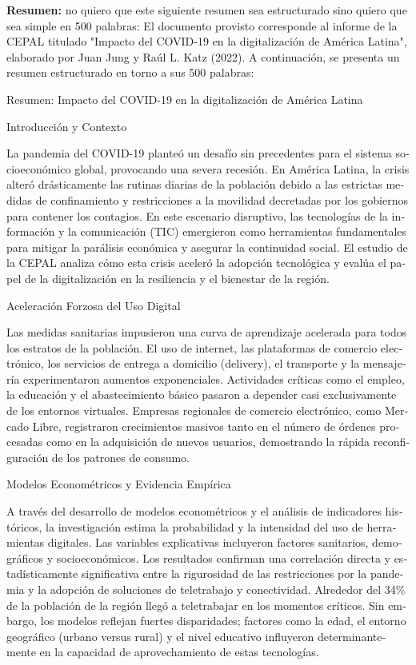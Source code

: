 \begin{tcolorbox}[colback=brown!8!white,colframe=brown!8!white,boxrule=0pt,arc=2pt,left=4pt,right=4pt,top=3pt,bottom=3pt,before skip=4pt,after skip=4pt]
\begin{otherlanguage}{spanish}
\sffamily\small \textbf{Resumen:} no quiero que este siguiente resumen sea estructurado sino quiero que sea simple en 500 palabras: El documento provisto corresponde al informe de la CEPAL titulado "Impacto del COVID-19 en la digitalización de América Latina", elaborado por Juan Jung y Raúl L. Katz (2022). A continuación, se presenta un resumen estructurado en torno a sus 500 palabras:

Resumen: Impacto del COVID-19 en la digitalización de América Latina

Introducción y Contexto

La pandemia del COVID-19 planteó un desafío sin precedentes para el sistema socioeconómico global, provocando una severa recesión. En América Latina, la crisis alteró drásticamente las rutinas diarias de la población debido a las estrictas medidas de confinamiento y restricciones a la movilidad decretadas por los gobiernos para contener los contagios. En este escenario disruptivo, las tecnologías de la información y la comunicación (TIC) emergieron como herramientas fundamentales para mitigar la parálisis económica y asegurar la continuidad social. El estudio de la CEPAL analiza cómo esta crisis aceleró la adopción tecnológica y evalúa el papel de la digitalización en la resiliencia y el bienestar de la región.

Aceleración Forzosa del Uso Digital

Las medidas sanitarias impusieron una curva de aprendizaje acelerada para todos los estratos de la población. El uso de internet, las plataformas de comercio electrónico, los servicios de entrega a domicilio (delivery), el transporte y la mensajería experimentaron aumentos exponenciales. Actividades críticas como el empleo, la educación y el abastecimiento básico pasaron a depender casi exclusivamente de los entornos virtuales. Empresas regionales de comercio electrónico, como Mercado Libre, registraron crecimientos masivos tanto en el número de órdenes procesadas como en la adquisición de nuevos usuarios, demostrando la rápida reconfiguración de los patrones de consumo.

Modelos Econométricos y Evidencia Empírica

A través del desarrollo de modelos econométricos y el análisis de indicadores históricos, la investigación estima la probabilidad y la intensidad del uso de herramientas digitales. Las variables explicativas incluyeron factores sanitarios, demográficos y socioeconómicos. Los resultados confirman una correlación directa y estadísticamente significativa entre la rigurosidad de las restricciones por la pandemia y la adopción de soluciones de teletrabajo y conectividad. Alrededor del 34\% de la población de la región llegó a teletrabajar en los momentos críticos. Sin embargo, los modelos reflejan fuertes disparidades; factores como la edad, el entorno geográfico (urbano versus rural) y el nivel educativo influyeron determinantemente en la capacidad de aprovechamiento de estas tecnologías.


\end{otherlanguage}
\end{tcolorbox}
